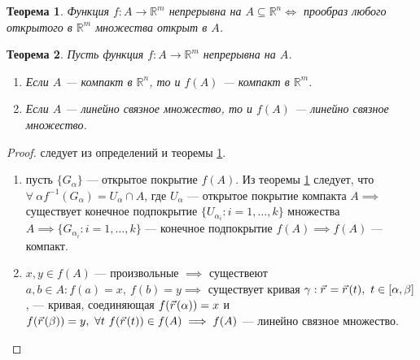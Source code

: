 \documentclass[12pt]{report}
\numberwithin{equation}{section}
\newtheorem{theorem}{Теорема}[section]
\newcommand{\pvec}[1]{\vec{#1}\mkern2mu\vphantom{#1}}
\begin{document}
\begin{theorem} \label{th:34:1}
Функция $f : A \to \mathbb{R}^m$ непрерывна на $A \subseteq \mathbb{R}^n \iff$ прообраз любого открытого в $\mathbb{R}^m$ множества открыт в $A$.
\end{theorem}

\begin{theorem} \label{th:34:2}
Пусть функция $f : A \to \mathbb{R}^m$ непрерывна на $A$.
\begin{enumerate}
\item[а)] Если $A$ --- компакт в $\mathbb{R}^n$, то и $f(A)$ --- компакт в $\mathbb{R}^m$.
\item[б)] Если $A$ --- линейно связное множество, то и $f(A)$ --- линейно связное множество.
\end{enumerate}
\end{theorem}
\begin{proof}
следует из определений и теоремы \ref{th:34:1}.
\begin{enumerate}
\item[а):] пусть $\{ G_{\alpha} \}$ --- открытое покрытие $f(A)$. Из теоремы \ref{th:34:1} следует, что $\forall~\alpha f^{-1} (G_{\alpha}) = U_{\alpha} \cap A$, где $U_{\alpha}$ --- открытое покрытие компакта $A \implies$ существует конечное подпокрытие $\{ U_{\alpha_i} : i = 1,\ldots, k\}$ множества $A \implies \{ G_{\alpha_i} : i = 1, \ldots, k\}$ --- конечное подпокрытие $f(A) \implies f(A)$ --- компакт.
\item[б):] $x,y \in f(A)$ --- произвольные $\implies$ существеют $a,b \in A : f(a) = x,~ f(b) = y \implies$ существует кривая $\gamma : \pvec{r} = \pvec{r}(t),~t \in [\alpha, \beta]$, --- кривая, соединяющая $f(\pvec{r}(\alpha)) = x$ и $f(\pvec{r}(\beta)) = y,~\forall t~f(\pvec{r}(t)) \in f(A) \implies f(A)$ --- линейно связное множество.
\end{enumerate}
\end{proof}
\end{document}
